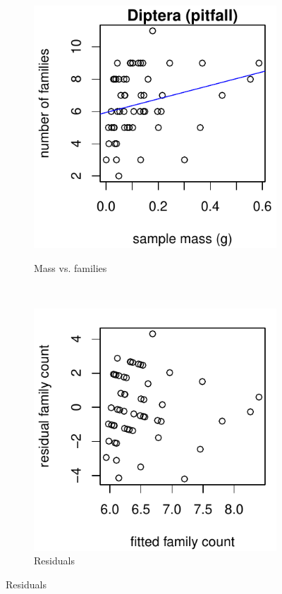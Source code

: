 \documentclass[10pt,letterpaper,twocolumn]{article}
\begin{document}
\begin{figure}[h]
	\centering
	\begin{subfigure}[b]{0.15\textwidth}
		\caption{Mass vs. families}
		\includegraphics[width=\textwidth]{plots/mass-vs-count/scatter/2015_pitfall_Diptera_mass-vs-count.pdf}
		\label{fig:pitfall_diptera_scatter}
	\end{subfigure}
	~
	\begin{subfigure}[b]{0.15\textwidth}
		\caption{Residuals}
		\includegraphics[width=\textwidth]{plots/mass-vs-count/residual/2015_pitfall_Diptera_residual.pdf}

\end{subfigure}
\end{figure}
\end{document}
